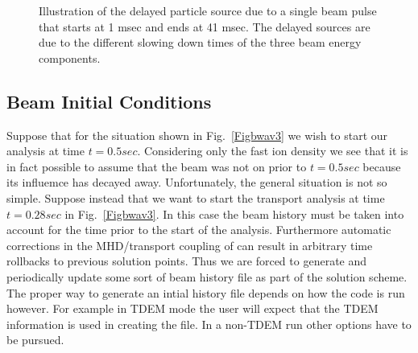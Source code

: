 \begin{figure}[hbt] %
 \centering     
 \mbox{}
 \caption{Illustration of the delayed particle source due to a single beam pulse
 that starts at 1 msec and ends at 41 msec. The delayed sources are due to the
 different slowing down times of the three beam energy components.}
 \label{Figbwav3c}
\end{figure}

\subsection{Beam Initial Conditions}
Suppose that for the situation shown in Fig.~\ref{Figbwav3}
we wish to start our analysis at time $t = 0.5 sec$. Considering 
only the fast ion density we see that it is in fact possible to 
assume that the beam was not on prior to $ t = 0.5 sec $
because its influemce has decayed away. Unfortunately, the
general situation is not so simple. Suppose instead that we
want to start the transport analysis at time $ t = 0.28 sec $
in Fig.~\ref{Figbwav3}. In this case the beam history must be
taken into account for the time prior to the start of the
analysis. Furthermore automatic corrections in the
MHD/transport coupling of \ot  can result in arbitrary time
rollbacks to previous solution points. Thus we are forced to 
generate and periodically update some sort of beam history file
as part of the solution scheme. The proper way to generate an
intial history file depends on how the code is run
however. For example in TDEM mode the user will expect
that the TDEM information is used in creating the file. In a
non-TDEM run other options have to be pursued. 

